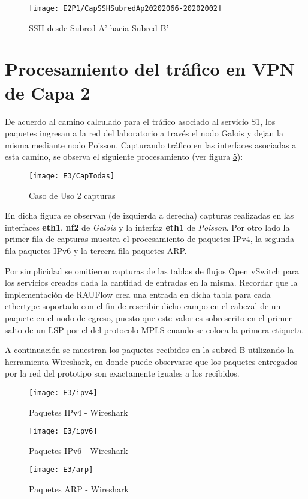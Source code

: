 \newpage
\begin{figure}[ht!] 
\centering    
\texttt{[image: E2P1/CapSSHSubredAp20202066-20202002]}
\caption[SSH desde Subred A' hacia Subred B']{SSH desde Subred A' hacia Subred B'}
\label{fig:CapSSHSApSBp}
\end{figure}

\section{Procesamiento del tr\'afico en VPN de Capa 2}
\label{appendix6.5}

De acuerdo al camino calculado para el tr\'afico asociado al servicio S1, los paquetes ingresan a la red del laboratorio a través el nodo Galois y dejan la misma mediante nodo Poisson. Capturando tr\'afico en las interfaces asociadas a esta camino, se observa el siguiente procesamiento (ver figura \ref{fig:CapturaTCP}):

\begin{figure}[h!] 
\centering    
\texttt{[image: E3/CapTodas]}
\caption[Caso de Uso 2 capturas]{Caso de Uso 2 capturas}
\label{fig:CapturaTCP}
\end{figure}

En dicha figura se observan (de izquierda a derecha) capturas realizadas en las interfaces \textbf{eth1}, \textbf{nf2} de \textit{Galois} y la interfaz \textbf{eth1} de \textit{Poisson}. Por otro lado la primer fila de capturas muestra el procesamiento de paquetes IPv4, la segunda fila paquetes IPv6 y la tercera fila paquetes ARP.

Por simplicidad se omitieron capturas de las tablas de flujos Open vSwitch para los servicios creados dada la cantidad de entradas en la misma. Recordar que la implementaci\'on de RAUFlow crea una entrada en dicha tabla para cada ethertype soportado con el fin de rescribir dicho campo en el cabezal de un paquete en el nodo de egreso, puesto que este valor es sobrescrito en el primer salto de un LSP por el del protocolo MPLS cuando se coloca la primera etiqueta.

A continuaci\'on se muestran los paquetes recibidos en la subred B utilizando la herramienta Wireshark, en donde puede observarse que los paquetes entregados por la red del prototipo son exactamente iguales a los recibidos.

\begin{figure}[h!] 
\centering    
\texttt{[image: E3/ipv4]}
\caption[Paquetes IPv4 - Wireshark]{Paquetes IPv4 - Wireshark}
\label{fig:CapturaTCP}
\end{figure}

\newpage
\begin{figure}[ht!] 
\centering    
\texttt{[image: E3/ipv6]}
\caption[CPaquetes IPv6 - Wireshark]{Paquetes IPv6 - Wireshark}
\label{fig:CapturaTCP}
\end{figure}

\begin{figure}[h!] 
\centering    
\texttt{[image: E3/arp]}
\caption[Paquetes ARP - Wireshark]{Paquetes ARP - Wireshark}
\label{fig:CapturaTCP}
\end{figure}